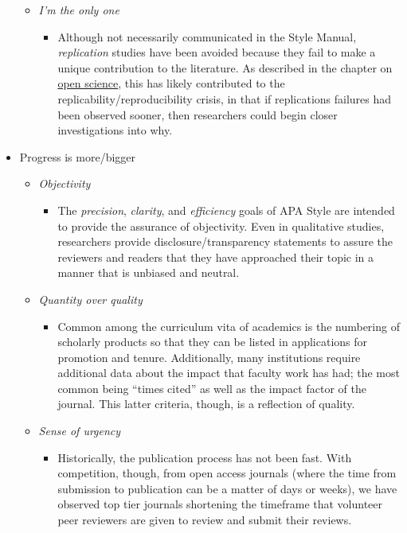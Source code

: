 \documentclass[
  11pt,
]{book}
\providecommand{\tightlist}{%
  \setlength{\itemsep}{0pt}\setlength{\parskip}{0pt}}
\begin{document}
\begin{itemize}
  \begin{itemize}
  \tightlist
  \item
    \emph{I'm the only one}

    \begin{itemize}
    \tightlist
    \item
      Although not necessarily communicated in the Style Manual, \emph{replication} studies have been avoided because they fail to make a unique contribution to the literature. As described in the chapter on \protect\hyperlink{OpSci}{open science}, this has likely contributed to the replicability/reproducibility crisis, in that if replications failures had been observed sooner, then researchers could begin closer investigations into why.
    \end{itemize}
  \end{itemize}
\item
  Progress is more/bigger

  \begin{itemize}
  \tightlist
  \item
    \emph{Objectivity}

    \begin{itemize}
    \tightlist
    \item
      The \emph{precision}, \emph{clarity}, and \emph{efficiency} goals of APA Style are intended to provide the assurance of objectivity. Even in qualitative studies, researchers provide disclosure/transparency statements to assure the reviewers and readers that they have approached their topic in a manner that is unbiased and neutral.
    \end{itemize}
  \item
    \emph{Quantity over quality}

    \begin{itemize}
    \tightlist
    \item
      Common among the curriculum vita of academics is the numbering of scholarly products so that they can be listed in applications for promotion and tenure. Additionally, many institutions require additional data about the impact that faculty work has had; the most common being ``times cited'' as well as the impact factor of the journal. This latter criteria, though, is a reflection of quality.
    \end{itemize}
  \item
    \emph{Sense of urgency}

    \begin{itemize}
    \tightlist
    \item
      Historically, the publication process has not been fast. With competition, though, from open access journals (where the time from submission to publication can be a matter of days or weeks), we have observed top tier journals shortening the timeframe that volunteer peer reviewers are given to review and submit their reviews.
    \end{itemize}
  \end{itemize}
\end{itemize}
\end{document}
